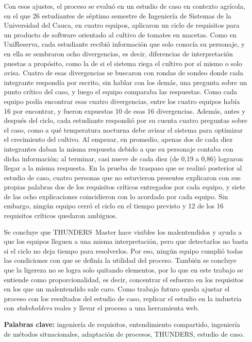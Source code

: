 \documentclass[12pt,letterpaper,oneside]{report}
\begin{document}
Con esos ajustes, el proceso se evaluó en un estudio de caso en contexto
agrícola, en el que 26 estudiantes de séptimo semestre de Ingeniería de
Sistemas de la Universidad del Cauca, en cuatro equipos, aplicaron un ciclo de requisitos para un producto
de software orientado al cultivo de tomates en macetas. Como en UniReserva, cada
estudiante recibió información que solo conocía su personaje, y en ella se
sembraron ocho divergencias, es decir, diferencias de interpretación puestas a
propósito, como la de si el sistema riega el cultivo por sí mismo o solo avisa.
Cuatro de esas divergencias se buscaron con rondas de sondeo donde cada
integrante respondía por escrito, sin hablar con los demás, una pregunta sobre
un punto crítico del caso, y luego el equipo comparaba las respuestas. Como cada
equipo podía encontrar esas cuatro divergencias, entre los cuatro equipos había
16 por encontrar, y fueron expuestas 10 de esas 16 divergencias. Además, antes y
después del ciclo, cada estudiante respondió por su cuenta cuatro preguntas
sobre el caso, como a qué temperatura nocturna debe avisar el sistema para
optimizar el crecimiento del cultivo. Al empezar, en promedio, apenas dos de cada
diez integrantes daban la misma respuesta debido a que su personaje contaba con
dicha información; al terminar, casi nueve de cada diez (de 0,19 a 0,86)
lograron llegar a la misma respuesta. En la prueba de traspaso que se realizó
posterior al estudio de caso, cuatro personas que no estuvieron presentes
explicaron con sus propias palabras dos de los requisitos críticos entregados
por cada equipo, y siete de las ocho explicaciones coincidieron con lo acordado
por cada equipo. Sin embargo, ningún equipo cerró el ciclo en el tiempo previsto
y 12 de los 16 requisitos críticos quedaron ambiguos.

Se concluye que THUNDERS~Master hace visibles los malentendidos y ayuda a que los
equipos lleguen a una misma interpretación, pero que detectarlos no basta si el
ciclo no deja tiempo para resolverlos. Por eso, ningún equipo cumplió todas las
condiciones con que se definía la utilidad del proceso. También se concluye que
la ligereza no se logra solo quitando elementos, por lo que en este trabajo se
entiende como proporcionalidad, es decir, concentrar el esfuerzo en los
requisitos en los que un malentendido sale caro. Como trabajo futuro queda
ajustar el proceso con los resultados del estudio de caso, replicar el estudio
en la industria con \textit{stakeholders} reales y llevar el proceso a una
herramienta web.

\vspace{0.4cm}
\noindent\textbf{Palabras clave:} ingeniería de requisitos, entendimiento
compartido, ingeniería de métodos situacionales, adaptación de procesos,
THUNDERS, estudio de caso.
\end{document}
